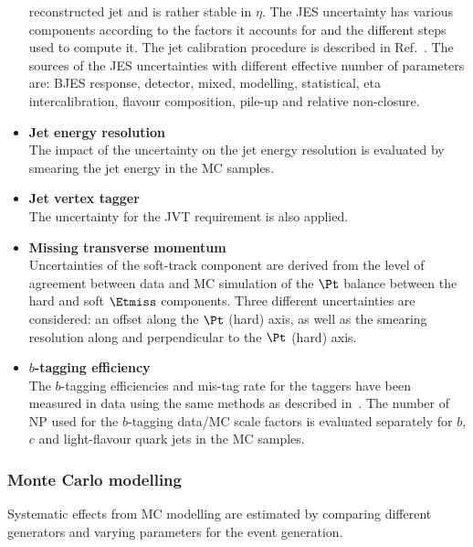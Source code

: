 \begin{itemize}
	reconstructed jet and is rather stable in $\eta$. The JES uncertainty
	has various components according to the factors it accounts for and
	the different steps used to compute it. The jet calibration procedure
	is described in Ref.~\cite{PERF-2016-04}.
	The sources of the JES uncertainties with different effective number
	of parameters are: BJES response, detector, mixed, modelling,
	statistical, eta intercalibration, flavour composition, pile-up and
	relative non-closure. 
	\item \textbf{Jet energy resolution} \\ 
	The impact of the uncertainty on the jet energy resolution is
	evaluated by smearing the jet energy in the MC samples. 
	\item \textbf{Jet vertex tagger} \\ 
	The uncertainty for the JVT requirement is also applied. 	
	\item \textbf{Missing transverse momentum} \\ 
	Uncertainties of the soft-track component are derived from the level
	of agreement between data and MC simulation of the $\Pt$ balance
	between the hard and soft $\Etmiss$ components. Three different
	uncertainties are considered: an offset along the $\Pt$ (hard) axis,
	as well as the smearing resolution along and perpendicular to the
	$\Pt$ (hard) axis.
	\item \textbf{$b$-tagging efficiency} \\ 
	The $b$-tagging efficiencies and mis-tag rate for the taggers have
	been measured in data using the same methods as described
	in~\cite{ATLAS-CONF-2014-046,ATLAS-CONF-2014-004}. The number of NP
	used for the $b$-tagging data/MC scale factors is evaluated
	separately for $b$, $c$ and light-flavour quark jets in the MC
	samples.	
\end{itemize}

\subsubsection{Monte Carlo modelling} 
Systematic effects from MC modelling are estimated by comparing
different generators and varying parameters for the event generation.

